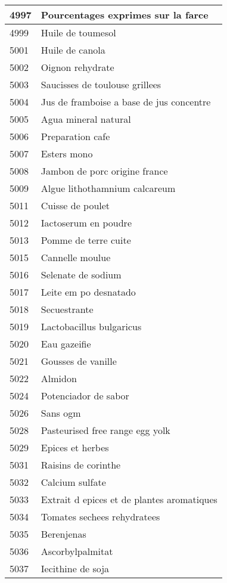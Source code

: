 \begin{longtable}{|l|l|}
4997 & Pourcentages exprimes sur la farce \\ \hline 
4999 & Huile de toumesol \\ \hline 
5001 & Huile de canola \\ \hline 
5002 & Oignon rehydrate \\ \hline 
5003 & Saucisses de toulouse grillees \\ \hline 
5004 & Jus de framboise a base de jus concentre \\ \hline 
5005 & Agua mineral natural \\ \hline 
5006 & Preparation cafe \\ \hline 
5007 & Esters mono \\ \hline 
5008 & Jambon de porc origine france \\ \hline 
5009 & Algue lithothamnium calcareum \\ \hline 
5011 & Cuisse de poulet \\ \hline 
5012 & Iactoserum en poudre \\ \hline 
5013 & Pomme de terre cuite \\ \hline 
5015 & Cannelle moulue \\ \hline 
5016 & Selenate de sodium \\ \hline 
5017 & Leite em po desnatado \\ \hline 
5018 & Secuestrante \\ \hline 
5019 & Lactobacillus bulgaricus \\ \hline 
5020 & Eau gazeifie \\ \hline 
5021 & Gousses de vanille \\ \hline 
5022 & Almidon \\ \hline 
5024 & Potenciador de sabor \\ \hline 
5026 & Sans ogm \\ \hline 
5028 & Pasteurised free range egg yolk \\ \hline 
5029 & Epices et herbes \\ \hline 
5031 & Raisins de corinthe \\ \hline 
5032 & Calcium sulfate \\ \hline 
5033 & Extrait d epices et de plantes aromatiques \\ \hline 
5034 & Tomates sechees rehydratees \\ \hline 
5035 & Berenjenas \\ \hline 
5036 & Ascorbylpalmitat \\ \hline 
5037 & Iecithine de soja \\ \hline 

\end{longtable}
